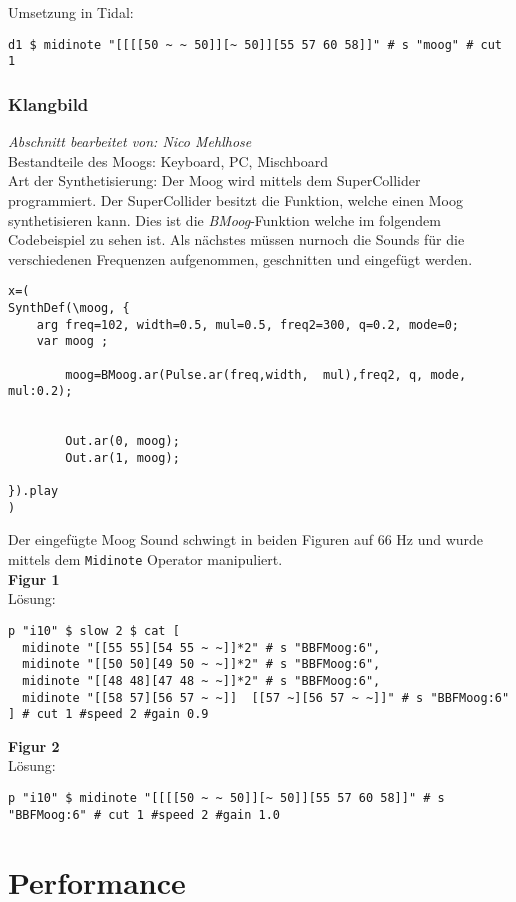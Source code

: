 \documentclass[
10pt, %
a4paper, %
oneside, %
headinclude,footinclude, %
BCOR5mm, %
]{scrartcl}
\begin{document}
\noindent Umsetzung in Tidal:
\begin{lstlisting}
d1 $ midinote "[[[[50 ~ ~ 50]][~ 50]][55 57 60 58]]" # s "moog" # cut 1
\end{lstlisting}

\subsubsection{Klangbild}
\textit{Abschnitt bearbeitet von: Nico Mehlhose}\\

\noindent Bestandteile des Moogs: Keyboard, PC, Mischboard\\
Art der Synthetisierung: Der Moog wird mittels dem SuperCollider programmiert. Der SuperCollider besitzt die Funktion, welche einen Moog synthetisieren kann.
Dies ist die \textit{BMoog}-Funktion welche im folgendem Codebeispiel zu sehen ist. Als nächstes müssen nurnoch die Sounds für die verschiedenen
Frequenzen aufgenommen, geschnitten und eingefügt werden.
\begin{lstlisting}
x=(
SynthDef(\moog, {
	arg freq=102, width=0.5, mul=0.5, freq2=300, q=0.2, mode=0;
	var moog ;
	
		moog=BMoog.ar(Pulse.ar(freq,width,  mul),freq2, q, mode, mul:0.2);
		
		
		Out.ar(0, moog);
		Out.ar(1, moog);
	
}).play
)
\end{lstlisting}
Der eingefügte Moog Sound schwingt in beiden Figuren auf 66 Hz und wurde mittels dem \verb|Midinote| Operator manipuliert.\\
\noindent\textbf{Figur 1}\\
Lösung:
\begin{lstlisting}
p "i10" $ slow 2 $ cat [
  midinote "[[55 55][54 55 ~ ~]]*2" # s "BBFMoog:6",
  midinote "[[50 50][49 50 ~ ~]]*2" # s "BBFMoog:6",
  midinote "[[48 48][47 48 ~ ~]]*2" # s "BBFMoog:6",
  midinote "[[58 57][56 57 ~ ~]]  [[57 ~][56 57 ~ ~]]" # s "BBFMoog:6"
] # cut 1 #speed 2 #gain 0.9
\end{lstlisting}
\noindent\textbf{Figur 2}\\
Lösung:
\begin{lstlisting}
p "i10" $ midinote "[[[[50 ~ ~ 50]][~ 50]][55 57 60 58]]" # s "BBFMoog:6" # cut 1 #speed 2 #gain 1.0
\end{lstlisting}


\section{Performance}
\end{document}
